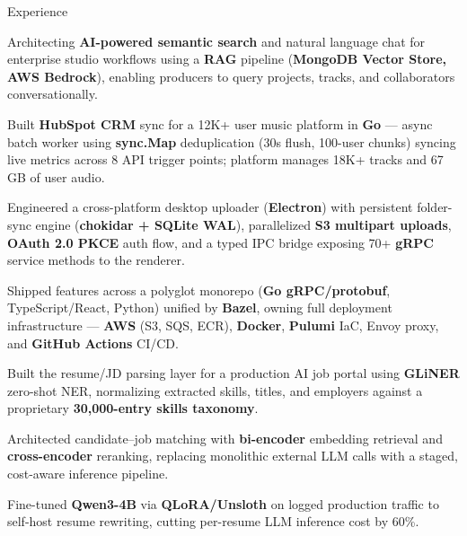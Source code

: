 \documentclass{resume}
\begin{document}
\begin{rSection}{Experience}
\scriptsize

\begin{jobitems}
    \item Architecting \textbf{AI-powered semantic search} and natural language chat for enterprise studio workflows using a \textbf{RAG} pipeline (\textbf{MongoDB Vector Store, AWS Bedrock}), enabling producers to query projects, tracks, and collaborators conversationally.
    \item Built \textbf{HubSpot CRM} sync for a 12K+ user music platform in \textbf{Go} --- async batch worker using \textbf{sync.Map} deduplication (30s flush, 100-user chunks) syncing live metrics across 8 API trigger points; platform manages 18K+ tracks and 67\,GB of user audio.
    \item Engineered a cross-platform desktop uploader (\textbf{Electron}) with persistent folder-sync engine (\textbf{chokidar + SQLite WAL}), parallelized \textbf{S3 multipart uploads}, \textbf{OAuth 2.0 PKCE} auth flow, and a typed IPC bridge exposing 70+ \textbf{gRPC} service methods to the renderer.
    \item Shipped features across a polyglot monorepo (\textbf{Go gRPC/protobuf}, TypeScript/React, Python) unified by \textbf{Bazel}, owning full deployment infrastructure --- \textbf{AWS} (S3, SQS, ECR), \textbf{Docker}, \textbf{Pulumi} IaC, Envoy proxy, and \textbf{GitHub Actions} CI/CD.
\end{jobitems}

\begin{jobitems}
    \item Built the resume/JD parsing layer for a production AI job portal using \textbf{GLiNER} zero-shot NER, normalizing extracted skills, titles, and employers against a proprietary \textbf{30,000-entry skills taxonomy}.
    \item Architected candidate--job matching with \textbf{bi-encoder} embedding retrieval and \textbf{cross-encoder} reranking, replacing monolithic external LLM calls with a staged, cost-aware inference pipeline.
    \item Fine-tuned \textbf{Qwen3-4B} via \textbf{QLoRA/Unsloth} on logged production traffic to self-host resume rewriting, cutting per-resume LLM inference cost by 60\%.
\end{jobitems}


\end{rSection}
\end{document}
